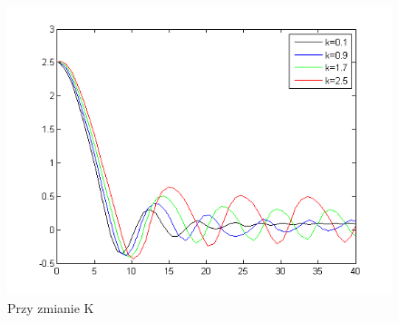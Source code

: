 \documentclass[a4paper,10pt]{article}
\begin{document}
\begin{enumerate}
\begin{figure}[!h]
    \centering
	\includegraphics[width=120mm]{CW3-korekcja-trojpolozeniowy-e_k.png}
	\caption{Przy zmianie K}
    \label{fig:Rysunek}
\end{figure}


\end{enumerate}
\end{document}
